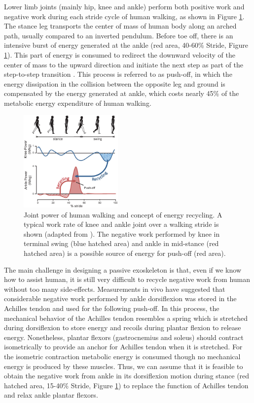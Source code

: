 \documentclass[twocolumn,cleanfoot,10pt]{asme2ej}
\begin{document}
	Lower limb joints (mainly hip, knee and ankle) perform both positive work and negative work during each stride cycle of human walking, as shown in Figure \ref{fig:work}. The stance leg transports the center of mass of human body along an arched path, usually compared to an inverted pendulum\cite{RN13}. Before toe off, there is an intensive burst of energy generated at the ankle (red area, 40-60\% Stride, Figure \ref{fig:work}). This part of energy is consumed to redirect the downward velocity of the center of mass to the upward direction and initiate the next step as part of the step-to-step transition \cite{RN14}. This process is referred to as push-off, in which the energy dissipation in the collision between the opposite leg and ground is compensated by the energy generated at ankle, which costs nearly 45\% of the metabolic energy expenditure of human walking\cite{RN15}. 		

\begin{figure}[b]
	\centering
	\includegraphics[width=0.45\textwidth]{Figure1.eps}
	\caption{Joint power of human walking and concept of energy recycling. A typical work rate of knee and ankle joint over a walking stride is shown (adapted from \cite{RN2}). The negative work performed by knee in terminal swing (blue hatched area) and ankle in mid-stance (red hatched area) is a possible source of energy for push-off (red area).}
	\label{fig:work}   
\end{figure}

The main challenge in designing a passive exoskeleton is that, even if we know how to assist human, it is still very difficult to recycle negative work from human without too many side-effects. Measurements in vivo have suggested that considerable negative work performed by ankle dorsiflexion was stored in the Achilles tendon and used for the following push-off\cite{RN16}. In this process, the mechanical behavior of the Achilles tendon resembles a spring which is stretched during dorsiflexion to store energy and recoils during plantar flexion to release energy. Nonetheless, plantar flexors (gastrocnemius and soleus) should contract isometrically to provide an anchor for Achilles tendon when it is stretched. For the isometric contraction metabolic energy is consumed though no mechanical energy is produced by these muscles\cite{RN17}. Thus, we can assume that it is feasible to obtain the negative work from ankle in its dorsiflexion motion during stance (red hatched area, 15-40\% Stride, Figure \ref{fig:work}) to replace the function of Achilles tendon and relax ankle plantar flexors.
\end{document}

